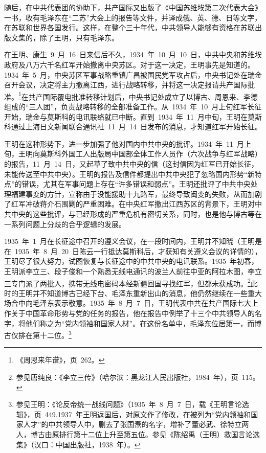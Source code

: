 随后，在中共代表团的协助下，共产国际又出版了《中国苏维埃第二次代表大会》一书，收有毛泽东在“二苏”大会上的报告等文件，并译成俄、英、德、日等文字，在苏联和世界各国发行。这样，在整个三十年代，中共领导人能够有资格在苏联出版文集的，除了王明，只有毛泽东。

在王明、康生~9~月~16~日来信后不久，1934~年~10~月~10~日，中共中央和苏维埃政府及八万六千名红军开始撤离中央苏区。对于这一决定，王明事先是知道的。1934~年~5~月，中央苏区军事战略重镇广昌被国民党军攻占后，中央书记处在瑞金召开会议，决定将主力撤离江西，进行战略转移，并将这一决定报请共产国际批准。\footnote{《周恩来年谱》，页~262。}在共产国际覆电批准转移计划后，中央书记处成立了以博古、周恩来、李德组成的“三人团”，负责战略转移的全部准备工作。从~1934~年~10~月上旬红军长征开始，瑞金与莫斯科的电讯联络就已中断。直到~1934~年~11~月中旬，王明在莫斯科通过上海日文新闻联合通讯社~11~月~14~日发布的消息，才知道红军开始长征。

王明在这种形势下，进一步加强了他对国内中共中央的批评。1934~年~11~月上旬，王明向莫斯科外国工人出版局中国部全体工作人员作（六次战争与红军战略）的报告，11~月~14~日，又起草了致中共中央的信（这封信因为红军已开始长征，未能传送至中共中央）。王明的报告及信件都提出中共中央犯了忽略国内形势“新特点”的错误，尤其在军事问题上存在“许多错误和弱点”。王明还批评了中共中央处理福建事变的方针，宣称由于没能援助十九路军，最终导致闽变的失败，从而加剧了红军冲破蒋介石围剿的严重困难。在中央红军撤出江西苏区的背景下，王明对中共中央的这些批评，与已经形成的严重危机有密切关系，同时，也是他与博古等在一系列问题上分歧的合乎逻辑的发展。

1935~年~1~月在长征途中召开的遵义会议，在一段时间内，王明并不知晓（王明是在~1935~年~8~月~20~日陈云一行抵达莫斯科后，才获知有关遵义会议的详情的），王明尽了很大努力，试图恢复与长征途中的中共中央的电讯联系。1935~年初春，王明派李立三、段子俊和一个熟悉无线电通讯的波兰人前往中亚的阿拉木图，李立三专门派了两批人，携带无线电密码本经新疆回国寻找红军，但都未获成功。\footnote{参见唐纯良：《李立三传》（哈尔滨：黑龙江人民出版社，1984~年），页~115。}此时的王明并不知道博古已经下台、毛泽东重新出山的消息，他仍然继续在一些重大场合中向毛泽东表示敬意。1935~年~8~月~7~日，王明代表中共在共产国际七大上作关于中国革命形势与党的任务的报告，他在报告中例举了十三个中共领导人的名字，将他们称之为“党内领袖和国家人材”。在这份名单中，毛泽东位居第一，而博古仅排在第十二位。\footnote{参见王明：《论反帝统一战线问题》（1935~年~8~月~7~日，载《王明言论选辑》，页~449.1937~年王明返国后，对原文作了修改，在被列为“党内领袖和国家人才”的中共领导人中，删去了张国焘的名字，增补了董必武、徐特立两人，博古由原排行第十二位上升至第五位。参见《陈绍禹（王明）救国言论选集》（汉口：中国出版社，1938~年）。}

